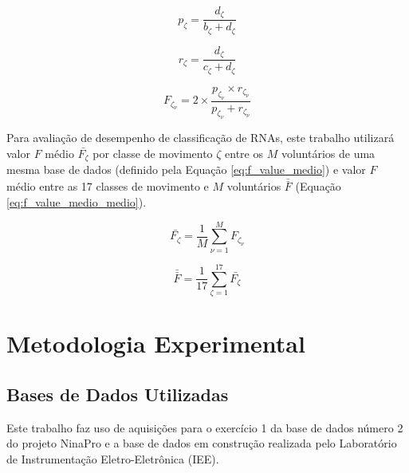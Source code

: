 \begin{equation}
\label{eq:precisao}
	p_\zeta = \frac{d_\zeta}{b_\zeta+d_\zeta}
\end{equation}

\begin{equation}
\label{eq:sensitividade}
	r_\zeta = \frac{d_\zeta}{c_\zeta+d_\zeta}
\end{equation}

\begin{equation}
\label{eq:fscore}
	F_{\zeta_{\nu}} = 2 \times \frac{p_{\zeta_{\nu}} \times r_{\zeta_{\nu}}}{p_{\zeta_{\nu}} + r_{\zeta_{\nu}}}
\end{equation}

Para avaliação de desempenho de classificação de RNAs, este trabalho utilizará valor $F$ médio $\bar{F_\zeta}$ por classe de movimento $\zeta$ entre os $M$ voluntários de uma mesma base de dados (definido pela Equação \ref{eq:f_value_medio}) e valor $F$ médio entre as 17 classes de movimento e $M$ voluntários $\bar{\bar{F}}$ (Equação \ref{eq:f_value_medio_medio}).

\begin{equation}
\label{eq:f_value_medio}
	\bar{F_\zeta} = \frac{1}{M}\sum\limits_{\nu = 1}^{M} F_{\zeta_{\nu}}
\end{equation}

\begin{equation}
\label{eq:f_value_medio_medio}
	\bar{\bar{F}} = \frac{1}{17}\sum\limits_{\zeta = 1}^{17} \bar{F_\zeta}
\end{equation}


	\chapter{Metodologia Experimental}

		\section{Bases de Dados Utilizadas}
Este trabalho faz uso de aquisições para o exercício 1 da base de dados número 2 do projeto NinaPro \cite{Gijsberts2014} e a base de dados em construção realizada pelo Laboratório de Instrumentação Eletro-Eletrônica (IEE).


